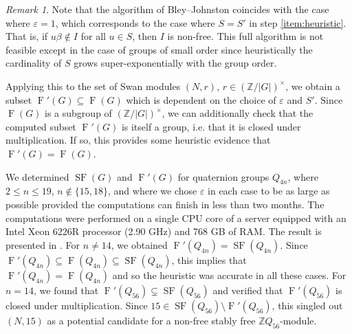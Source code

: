 \documentclass[11pt,leqno,a4paper]{amsart}
\newcommand{\Z}{\mathbb{Z}}
\DeclareMathOperator{\SF}{SF}
\DeclareMathOperator{\FF}{F}
\theoremstyle{definition}
\theoremstyle{remark}
\newtheorem{remark}[thm]{Remark}
\theoremstyle{custom}
\begin{document}
\begin{remark}
Note that the algorithm of Bley--Johnston coincides with the case where $\varepsilon = 1$, which corresponds to the case where $S = S'$ in step \cref{item:heuristic}. That is, if $u\beta \not \in I$ for all $u \in S$, then $I$ is non-free. 
This full algorithm is not feasible except in the case of groups of small order since heuristically the cardinality of $S$ grows super-exponentially with the group order.
\end{remark}

Applying this to the set of Swan modules $(N, r)$, $r \in (\Z/|G|)^\times$, we obtain a subset ${\FF'(G)} \subseteq \FF(G)$ which is dependent on the choice of $\varepsilon$ and $S'$. Since $\FF(G)$ is a subgroup of $(\Z/|G|)^\times$, we can additionally check that the computed subset $\FF'(G)$ is itself a group, i.e. that it is closed under multiplication. If so, this provides some heuristic evidence that $\FF'(G) = \FF(G)$.

We determined $\SF(G)$ and ${\FF'(G)}$ for quaternion groups $Q_{4n}$, where $2 \leq n \leq 19$, $n \not\in \{15,18\}$, and where we chose $\varepsilon$ in each case to be as large as possible provided the computations can finish in less than two months.
The computations were performed on a single CPU core of a server equipped with an Intel Xeon 6226R processor (2.90 GHz) and 768 GB of RAM.
The result is presented in .
For $n \ne 14$, we obtained $\FF'(Q_{4n}) = \SF(Q_{4n})$. Since $\FF'(Q_{4n}) \subseteq \FF(Q_{4n}) \subseteq \SF(Q_{4n})$, this implies that $\FF'(Q_{4n}) = \FF(Q_{4n})$ and so the heuristic was accurate in all these cases.
For $n = 14$, we found that $\FF'(Q_{56}) \subsetneq \SF(Q_{56})$ and verified that $\FF'(Q_{56})$ is closed under multiplication. Since $15 \in \SF(Q_{56}) \setminus \FF'(Q_{56})$, this singled out $(N,15)$ as a potential candidate for a non-free stably free $\Z Q_{56}$-module.
\end{document}
